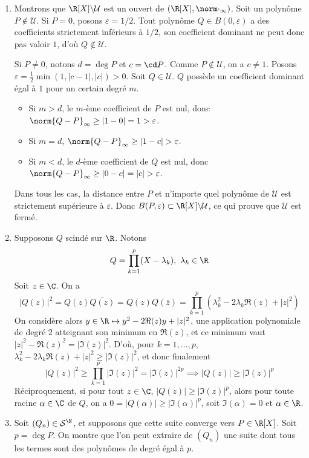 \begin{solution}
    \begin{enumerate}
        \item Montrons que $\R[X]\backslash\mathcal U$ est un ouvert de $(\R[X],\norm\cdot_\infty)$.
        Soit un polynôme $P \notin \mathcal U$. 
        Si $P = 0$, posons $\varepsilon = 1/2$. Tout polynôme $Q \in B(0, \varepsilon)$ a des coefficients strictement inférieurs à $1/2$, son coefficient dominant ne peut donc pas valoir $1$, d'où $Q \notin \mathcal U$.
        
        Si $P \neq 0$, notons $d = \deg P$ et $c = \cd P$. Comme $P \notin \mathcal U$, on a $c \neq 1$.
        Posons $\varepsilon = \frac{1}{2}\min(1, |c - 1|, |c|) > 0$.
        Soit $Q \in \mathcal U$. $Q$ possède un coefficient dominant égal à $1$ pour un certain degré $m$.
        \begin{itemize}
            \item Si $m > d$, le $m$-ème coefficient de $P$ est nul, donc $\norm{Q-P}_\infty \geq |1 - 0| = 1 > \varepsilon$.
            \item Si $m = d$, $\norm{Q-P}_\infty \geq |1 - c| > \varepsilon$.
            \item Si $m < d$, le $d$-ème coefficient de $Q$ est nul, donc $\norm{Q-P}_\infty \geq |0 - c| = |c| > \varepsilon$.
        \end{itemize}
        Dans tous les cas, la distance entre $P$ et n'importe quel polynôme de $\mathcal U$ est strictement supérieure à $\varepsilon$. Donc $B(P,\varepsilon) \subset \R[X]\backslash\mathcal U$, ce qui prouve que $\mathcal U$ est fermé.
        \item Supposons $Q$ scindé sur $\R$.
        Notons
        \[
            Q=\prod_{k=1}^p(X-\lambda_k),\ \lambda_k\in\R  
        \]
        Soit $z\in\C$. On a
        \[
            |Q(z)|^2=Q(z)\overline{Q(z)}=Q(z)Q(\overline z)=\prod_{k=1}^p(\lambda_k^2-2\lambda_k\Re(z)+|z|^2)
        \]
        On considère alors $y\in\R\mapsto y^2-2\Re(z)y+|z|^2$, une application polynomiale de degré $2$ atteignant son minimum en $\Re(z)$, et ce minimum vaut $|z|^2 - \Re(z)^2 = |\Im(z)|^2$.
        D'où, pour $k=1,\dots,p$, $\lambda_k^2-2\lambda_k\Re(z)+|z|^2\geq |\Im(z)|^2$, et donc finalement 
        \[
            |Q(z)|^2\geq\prod_{k=1}^p|\Im(z)|^2=|\Im(z)|^{2p} \implies |Q(z)|\geq|\Im(z)|^p
        \]
        Réciproquement, si pour tout $z\in \C$, $|Q(z)|\geq|\Im(z)|^p$, alors pour toute racine $\alpha\in\C$ de $Q$, on a $0=|Q(\alpha)|\geq|\Im(\alpha)|^p$, soit $\Im(\alpha)=0$ et $\alpha\in\R$.
        \item Soit $(Q_n)\in\mathcal S^{\N}$, et supposons que cette suite converge vers $P\in\R[X]$.
        Soit $p=\deg P$. On montre que l'on peut extraire de $(Q_n)$ une suite dont tous les termes sont des polynômes de degré égal à $p$.
        

\end{enumerate}
\end{solution}
